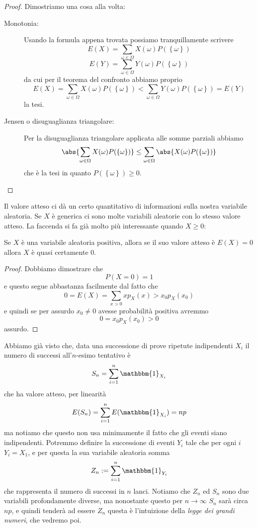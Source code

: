 \documentclass[11pt]{scrartcl}
\begin{document}
	\begin{proof}
		Dimostriamo una cosa alla volta:
		\begin{description}
			\item[Monotonia:] Usando la formula appena trovata possiamo tranquillamente scrivere
			$$E(X)=\sum_{\omega\in\Omega}X(\omega)P(\left\{\omega\right\})$$
			$$E(Y)=\sum_{\omega\in\Omega}Y(\omega)P(\left\{\omega\right\})$$
			da cui per il teorema del confronto abbiamo proprio
			$$E(X)=\sum_{\omega\in\Omega}X(\omega)P(\left\{\omega\right\})<\sum_{\omega\in\Omega}Y(\omega)P(\left\{\omega\right\})=E(Y)$$
			la tesi.
			\item[Jensen o disuguaglianza triangolare:] Per la disuguaglianza triangolare applicata alle somme parziali abbiamo
			$$\abs{\sum_{\omega\in\Omega}X(\omega)P(\left\{\omega\right\})}\le\sum_{\omega\in\Omega}\abs{X(\omega)P(\left\{\omega\right\})}$$
			che è la tesi in quanto $P(\left\{\omega\right\})\ge 0$.
		\end{description}
	\end{proof}
	Il valore atteso ci dà un certo quantitativo di informazioni sulla nostra variabile aleatoria. Se $X$ è generica ci sono molte variabili aleatorie con lo stesso valore atteso. La faccenda si fa già molto più interessante quando $X\ge 0$:
	\begin{proposition}
		Se $X$ è una variabile aleatoria positiva, allora se il suo valore atteso è $E(X)=0$ allora $X$ è quasi certamente $0$.
	\end{proposition}
	\begin{proof}
		Dobbiamo dimostrare che 
		$$P(X=0)=1$$
		e questo segue abbastanza facilmente dal fatto che 
		$$0=E(X)=\sum_{x>0}xp_X(x)>x_0p_X(x_0)$$
		e quindi se per assurdo $x_0\ne 0$ avesse probabilità positiva avremmo 
		$$0=x_0p_X(x_0)>0$$
		assurdo.
	\end{proof}
	\begin{example}
		Abbiamo già visto che, data una successione di prove ripetute indipendenti $X_i$ il numero di successi all'$n$-esimo tentativo è
		$$S_n=\sum_{i=1}^{n}\mathbbm{1}_{X_i}$$
		che ha valore atteso, per linearità
		$$E(S_n)=\sum_{i=1}^{n}E(\mathbbm{1}_{X_i})=np$$
		ma notiamo che questo non usa minimamente il fatto che gli eventi siano indipendenti. Potremmo definire la successione di eventi $Y_i$ tale che per ogni $i$ $Y_i=X_1$, e per questa la sua variabile aleatoria somma
		$$Z_n:=\sum_{i=1}^{n}\mathbbm{1}_{Y_i}$$
		che rappresenta il numero di successi in $n$ lanci. Notiamo che $Z_n$ ed $S_n$ sono due variabili profondamente diverse, ma nonostante questo per $n\to\infty$ $S_n$ sarà circa $np$, e quindi tenderà ad essere $Z_n$ questa è l'intuizione della \textit{legge dei grandi numeri}, che vedremo poi. 
	\end{example}
\end{document}
